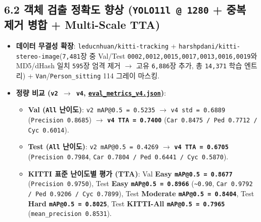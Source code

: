 \documentclass[10.5pt,a4paper]{article}
\begin{document}
\subsection{6.2 객체 검출 정확도 향상 (\texttt{YOLO11l @ 1280} + 중복 제거 병합 + Multi-Scale TTA)}
\begin{itemize}[leftmargin=1.5em,itemsep=2pt]
\item \textbf{데이터 무결성 확장}: \texttt{leducnhuan/\allowbreak{}kitti-\allowbreak{}tracking} + \texttt{harshpdani/\allowbreak{}kitti-\allowbreak{}stereo-\allowbreak{}image}(\texttt{7,\allowbreak{}481}장 중 Val/Test \texttt{0002,\allowbreak{}0012,\allowbreak{}0015,\allowbreak{}0017,\allowbreak{}0013,\allowbreak{}0016,\allowbreak{}0019}와 MD5/dHash 일치 \texttt{595}장 엄격 제거 $\rightarrow$ 고유 \texttt{6,\allowbreak{}886}장 추가, 총 \texttt{14,\allowbreak{}371} 학습 엔트리) + \texttt{Van}/\texttt{Person\_\allowbreak{}sitting} 114 그레이 마스킹.
\item \textbf{정량 비교 (\texttt{v2 $\rightarrow$ v4}, \href{https://github.com/Heisnotanimposter/Totalcare\_autonomous\_driving\_Yolov5/blob/main/results/v4\_road\_lane/detect\_outputs/outputs/eval\_metrics\_v4.json}{\texttt{eval\_\allowbreak{}metrics\_\allowbreak{}v4.\allowbreak{}json}})}:
\begin{itemize}[leftmargin=1.5em,itemsep=2pt]
\item \textbf{Val (\texttt{All} 난이도)}: \texttt{v2 mAP@0.\allowbreak{}5 = 0.\allowbreak{}5235} $\rightarrow$ \texttt{v4 std = 0.\allowbreak{}6889} (\texttt{Precision 0.\allowbreak{}8685}) $\rightarrow$ \textbf{\texttt{v4 TTA = 0.\allowbreak{}7400}} (\texttt{Car 0.\allowbreak{}8475 /\allowbreak{} Ped 0.\allowbreak{}7712 /\allowbreak{} Cyc 0.\allowbreak{}6014}).
\item \textbf{Test (\texttt{All} 난이도)}: \texttt{v2 mAP@0.\allowbreak{}5 = 0.\allowbreak{}4269} $\rightarrow$ \textbf{\texttt{v4 TTA = 0.\allowbreak{}6705}} (\texttt{Precision 0.\allowbreak{}7984}, \texttt{Car 0.\allowbreak{}7804 /\allowbreak{} Ped 0.\allowbreak{}6441 /\allowbreak{} Cyc 0.\allowbreak{}5870}).
\item \textbf{KITTI 표준 난이도별 평가 (TTA)}: Val \textbf{Easy \texttt{mAP@0.\allowbreak{}5 = 0.\allowbreak{}8677}} (\texttt{Precision 0.\allowbreak{}9750}), Test \textbf{Easy \texttt{mAP@0.\allowbreak{}5 = 0.\allowbreak{}8966}} (\texttt{\textasciitilde{}0.\allowbreak{}90}, \texttt{Car 0.\allowbreak{}9792 /\allowbreak{} Ped 0.\allowbreak{}9206 /\allowbreak{} Cyc 0.\allowbreak{}7899}), Test \textbf{Moderate \texttt{mAP@0.\allowbreak{}5 = 0.\allowbreak{}8404}}, Test \textbf{Hard \texttt{mAP@0.\allowbreak{}5 = 0.\allowbreak{}8025}}, Test \textbf{KITTI-All \texttt{mAP@0.\allowbreak{}5 = 0.\allowbreak{}7965}} (\texttt{mean\_\allowbreak{}precision 0.\allowbreak{}8531}).

\end{itemize}
\end{itemize}
\end{document}

